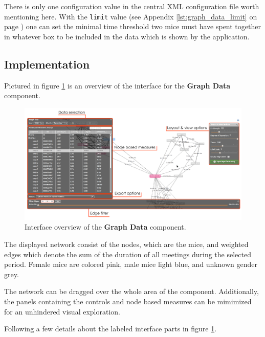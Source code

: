 There is only one configuration value in the central XML configuration file worth mentioning here. With the \lstinline|limit| value (see Appendix \ref{lst:graph_data_limit} on page \pageref{lst:graph_data_limit}) one can set the minimal time threshold two mice must have spent together in whatever box to be included in the data which is shown by the application. 
 

\subsection{Implementation}
\label{subsec:graph_explore}

Pictured in figure \ref{fig:graph_data_interface_overview} is an overview of the interface for the \textbf{Graph Data} component. 

\begin{figure}[!htpb]
\begin{center}
  \includegraphics[width=\textwidth]{assets/pdf/graph_data_interface_overview.pdf}
  \caption[Graph Data interface overview]{Interface overview of the \textbf{Graph Data} component.}
  \label{fig:graph_data_interface_overview}
\end{center}
\end{figure}

The displayed network consist of the nodes, which are the mice, and weighted edges which denote the sum of the duration of all meetings during the selected period. Female mice are colored pink, male mice light blue, and unknown gender grey. 

The network can be dragged over the whole area of the component. Additionally, the panels containing the controls and node based measures can be mimimized for an unhindered visual exploration.

Following a few details about the labeled interface parts in figure \ref{fig:graph_data_interface_overview}.

